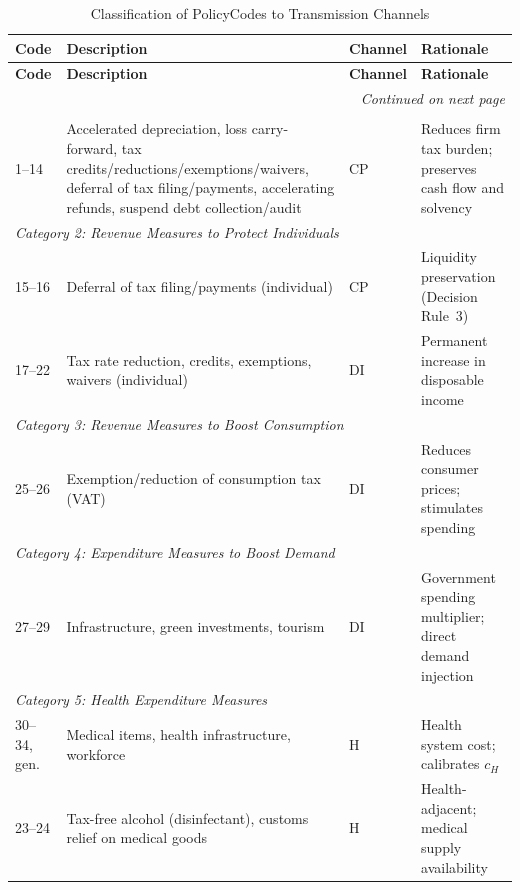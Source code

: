 \documentclass[12pt, a4paper]{article}
\begin{document}
\begin{small}
\begin{longtable}{p{0.8cm} p{5.5cm} p{1.2cm} p{5.5cm}}
\caption{Classification of PolicyCodes to Transmission Channels}
\label{tab:mapping_full} \\
\toprule
\textbf{Code} & \textbf{Description} & \textbf{Channel} & \textbf{Rationale} \\
\midrule
\endfirsthead
\toprule
\textbf{Code} & \textbf{Description} & \textbf{Channel} & \textbf{Rationale} \\
\midrule
\endhead
\midrule
\multicolumn{4}{r}{\textit{Continued on next page}} \\
\bottomrule
\endfoot
\bottomrule
\endlastfoot

\multicolumn{4}{l}{\textit{Category 1: Revenue Measures to Protect Businesses}} \\
\midrule
1--14 & Accelerated depreciation, loss carry-forward, tax credits/reductions/exemptions/waivers, deferral of tax filing/payments, accelerating refunds, suspend debt collection/audit & CP & Reduces firm tax burden; preserves cash flow and solvency \\
\midrule

\multicolumn{4}{l}{\textit{Category 2: Revenue Measures to Protect Individuals}} \\
\midrule
15--16 & Deferral of tax filing/payments (individual) & CP & Liquidity preservation (Decision Rule~3) \\
17--22 & Tax rate reduction, credits, exemptions, waivers (individual) & DI & Permanent increase in disposable income \\
\midrule

\multicolumn{4}{l}{\textit{Category 3: Revenue Measures to Boost Consumption}} \\
\midrule
25--26 & Exemption/reduction of consumption tax (VAT) & DI & Reduces consumer prices; stimulates spending \\
\midrule

\multicolumn{4}{l}{\textit{Category 4: Expenditure Measures to Boost Demand}} \\
\midrule
27--29 & Infrastructure, green investments, tourism & DI & Government spending multiplier; direct demand injection \\
\midrule

\multicolumn{4}{l}{\textit{Category 5: Health Expenditure Measures}} \\
\midrule
30--34, gen. & Medical items, health infrastructure, workforce & H & Health system cost; calibrates $c_H$ \\
23--24 & Tax-free alcohol (disinfectant), customs relief on medical goods & H & Health-adjacent; medical supply availability \\
\midrule


\end{longtable}
\end{small}
\end{document}
